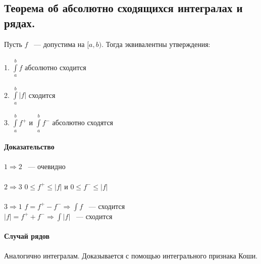 \documentclass[../main.tex]{subfiles}
\begin{document}
\subsection{Теорема об абсолютно сходящихся интегралах и рядах.}
Пусть $f$ ~--- допустима на $[a, b)$. Тогда эквивалентны утверждения:\\\\
1. $\int\limits^b_a f$ абсолютно сходится\\\\
2. $\int\limits^b_a |f|$ сходится\\\\
3. $\int\limits^b_a f^+$ и $\int\limits^b_a f^-$ абсолютно сходятся\\\\
\textbf{Доказательство}\\\\
$1 \Rightarrow 2$ ~--- очевидно\\\\
$2 \Rightarrow 3$ $0 \leq f^+ \leq |f|$ и $0 \leq f^- \leq |f|$\\\\
$3 \Rightarrow 1$ $f = f^+ - f^- \Rightarrow \int f$ ~--- сходится\\
$|f| = f^+ + f^- \Rightarrow \int |f|$ ~--- сходится\\\\
\textbf{Случай рядов}\\\\
Аналогично интегралам. Доказывается с помощью интегрального признака Коши.


\newpage
\end{document}
